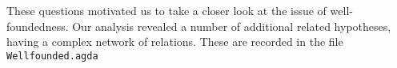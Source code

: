 %
These questions motivated us to take a closer look at the issue of well-foundedness.
Our analysis revealed a number of additional related hypotheses, having a complex
network of relations.  %
These are recorded in the file \verb|Wellfounded.agda|


%
%

